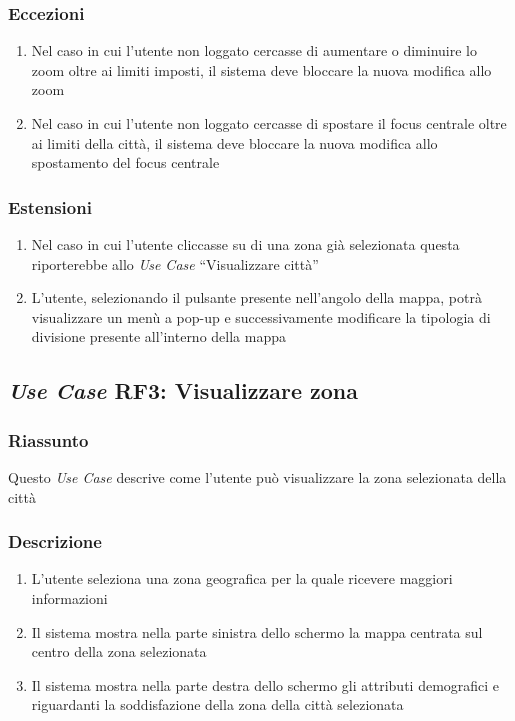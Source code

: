         \subsubsection{Eccezioni}
            \begin{enumerate}
                \item Nel caso in cui l'utente non loggato cercasse di aumentare o diminuire lo zoom oltre ai limiti imposti, il sistema deve bloccare la nuova modifica allo zoom
                \item Nel caso in cui l'utente non loggato cercasse di spostare il focus centrale oltre ai limiti della città, il sistema deve bloccare la nuova modifica allo spostamento del focus centrale
            \end{enumerate}
        \subsubsection{Estensioni}
            \begin{enumerate}
                \item Nel caso in cui l'utente cliccasse su di una zona già selezionata questa riporterebbe allo \textit{Use Case} ``Visualizzare città''
                \item L'utente, selezionando il pulsante presente nell'angolo della mappa, potrà visualizzare un menù a pop-up e successivamente modificare la tipologia di divisione presente all'interno della mappa
            \end{enumerate}
    
    \subsection{\textit{Use Case} RF3: Visualizzare zona}
        \subsubsection{Riassunto}
            Questo \textit{Use Case} descrive come l'utente può visualizzare la zona selezionata della città
        \subsubsection{Descrizione}
            \begin{enumerate}
                \item L'utente seleziona una zona geografica per la quale ricevere maggiori informazioni
                \item Il sistema mostra nella parte sinistra dello schermo la mappa centrata sul centro della zona selezionata
                \item Il sistema mostra nella parte destra dello schermo gli attributi demografici e riguardanti la soddisfazione della zona della città selezionata
            \end{enumerate}

